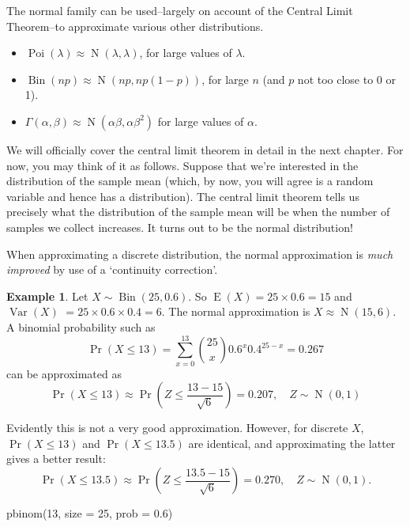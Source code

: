 \documentclass[
]{book}
\newenvironment{Shaded}{\begin{snugshade}}{\end{snugshade}}
\newcommand{\AttributeTok}[1]{\textcolor[rgb]{0.77,0.63,0.00}{#1}}
\newcommand{\DecValTok}[1]{\textcolor[rgb]{0.00,0.00,0.81}{#1}}
\newcommand{\FloatTok}[1]{\textcolor[rgb]{0.00,0.00,0.81}{#1}}
\newcommand{\FunctionTok}[1]{\textcolor[rgb]{0.00,0.00,0.00}{#1}}
\newcommand{\NormalTok}[1]{#1}
\providecommand{\tightlist}{%
  \setlength{\itemsep}{0pt}\setlength{\parskip}{0pt}}
\DeclareMathOperator{\E}{E}
\DeclareMathOperator{\Var}{Var}
\DeclareMathOperator{\N}{N}
\DeclareMathOperator{\Bin}{Bin}
\DeclareMathOperator{\Pois}{Poi}
\theoremstyle{definition}
\theoremstyle{definition}
\newtheorem{example}{Example}[chapter]
\theoremstyle{definition}
\theoremstyle{definition}
\theoremstyle{remark}
\begin{document}
The normal family can be used--largely on account of the Central Limit Theorem--to approximate various other distributions.

\begin{itemize}
\tightlist
\item
  \(\Pois(\lambda) \approx \N(\lambda,\lambda)\), for large values of \(\lambda\).
\item
  \(\Bin(np) \approx \N(np,np(1-p))\), for large \(n\) (and \(p\) not too close to 0 or 1).
\item
  \(\Gamma(\alpha,\beta) \approx \N(\alpha\beta, \alpha\beta^2)\) for large values of \(\alpha\).
\end{itemize}

We will officially cover the central limit theorem in detail in the next chapter. For now, you may think of it as follows. Suppose that we're interested in the distribution of the sample mean (which, by now, you will agree is a random variable and hence has a distribution). The central limit theorem tells us precisely what the distribution of the sample mean will be when the number of samples we collect increases. It turns out to be the normal distribution!

When approximating a discrete distribution, the normal approximation is \emph{much improved} by use of a `continuity correction'.

\begin{example}
Let \(X\sim\Bin(25, 0.6)\). So \(\E(X)=25\times 0.6=15\) and \(\Var(X)\) \(=25\times0.6\times 0.4=6\). The normal approximation is \(X \approx \N(15, 6)\).
A binomial probability such as
\[
\Pr(X\leq 13)=\sum_{x=0}^{13} {25 \choose x} 0.6^x0.4^{25-x}=0.267
\]
can be approximated as
\[
\Pr(X\leq 13)\approx \Pr\left(Z \leq \frac{13-15}{\sqrt 6}\right)=0.207, \hspace{1em} Z\sim\N(0,1)
\]

Evidently this is not a very good approximation. However, for discrete \(X\), \(\Pr(X\leq 13)\) and \(\Pr(X\leq 13.5)\) are identical, and approximating the latter gives a better result:
\[
\Pr(X\leq 13.5)\approx \Pr\left(Z \leq \frac{13.5-15}{\sqrt 6}\right)=0.270, \hspace{1em} Z\sim\N(0,1).
\]
\end{example}

\begin{Shaded}
\begin{Highlighting}[]
\FunctionTok{pbinom}\NormalTok{(}\DecValTok{13}\NormalTok{, }\AttributeTok{size =} \DecValTok{25}\NormalTok{, }\AttributeTok{prob =} \FloatTok{0.6}\NormalTok{)}
\end{Highlighting}
\end{Shaded}
\end{document}
